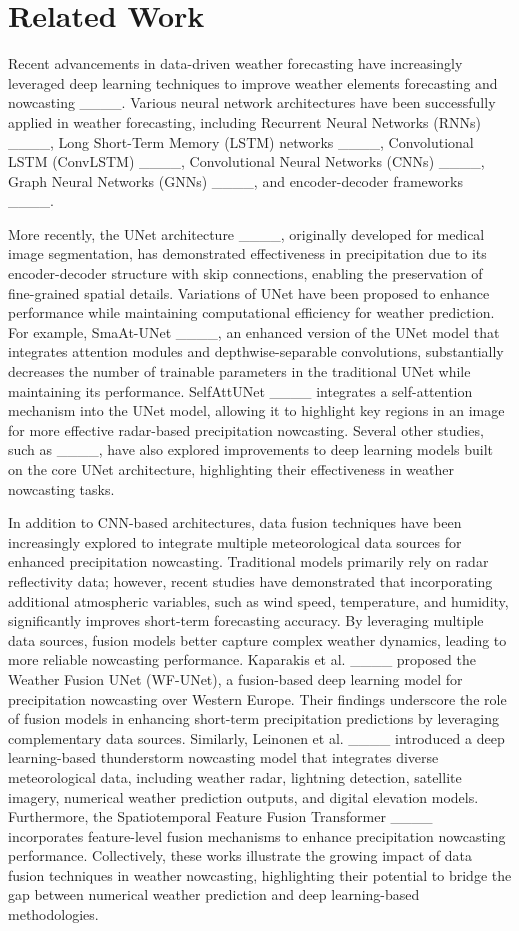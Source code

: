 \section{Related Work}
Recent advancements in data-driven weather forecasting have increasingly leveraged deep learning techniques to improve weather elements forecasting and nowcasting ____. Various neural network architectures have been successfully applied in weather forecasting, including Recurrent Neural Networks (RNNs) ____, Long Short-Term Memory (LSTM) networks ____, Convolutional LSTM (ConvLSTM) ____, Convolutional Neural Networks (CNNs) ____, Graph Neural Networks (GNNs) ____, and encoder-decoder frameworks ____.

More recently, the UNet architecture ____, originally developed for medical image segmentation, has demonstrated effectiveness in precipitation due to its encoder-decoder structure with skip connections, enabling the preservation of fine-grained spatial details. Variations of UNet have been proposed to enhance performance while maintaining computational efficiency for weather prediction. For example, SmaAt-UNet ____, an enhanced version of the UNet model that integrates attention modules and depthwise-separable convolutions, substantially decreases the number of trainable parameters in the traditional UNet while maintaining its performance. SelfAttUNet ____ integrates a self-attention mechanism into the UNet model, allowing it to highlight key regions in an image for more effective radar-based precipitation nowcasting.  
Several other studies, such as ____, have also explored improvements to deep learning models built on the core UNet architecture, highlighting their effectiveness in weather nowcasting tasks. 

In addition to CNN-based architectures, data fusion techniques have been increasingly explored to integrate multiple meteorological data sources for enhanced precipitation nowcasting. Traditional models primarily rely on radar reflectivity data; however, recent studies have demonstrated that incorporating additional atmospheric variables, such as wind speed, temperature, and humidity, significantly improves short-term forecasting accuracy. By leveraging multiple data sources, fusion models better capture complex weather dynamics, leading to more reliable nowcasting performance. Kaparakis et al. ____ proposed the Weather Fusion UNet (WF-UNet), a fusion-based deep learning model for precipitation nowcasting over Western Europe. Their findings underscore the role of fusion models in enhancing short-term precipitation predictions by leveraging complementary data sources. Similarly, Leinonen et al. ____ introduced a deep learning-based thunderstorm nowcasting model that integrates diverse meteorological data, including weather radar, lightning detection, satellite imagery, numerical weather prediction outputs, and digital elevation models. Furthermore, the Spatiotemporal Feature Fusion Transformer ____ incorporates feature-level fusion mechanisms to enhance precipitation nowcasting performance. Collectively, these works illustrate the growing impact of data fusion techniques in weather nowcasting, highlighting their potential to bridge the gap between numerical weather prediction and deep learning-based methodologies.